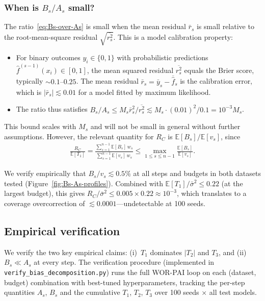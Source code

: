 \documentclass[11pt]{article}
\newcommand{\fhat}{\hat{f}}
\begin{document}
\subsubsection*{When is $B_s/A_s$ small?}

The ratio~\eqref{eq:Bs-over-As} is small when the mean residual $\bar{r}_s$ is small relative to the root-mean-square residual $\sqrt{\overline{r_s^2}}$. This is a model calibration property:
\begin{itemize}
    \item For binary outcomes $y_i \in \{0,1\}$ with probabilistic predictions $\fhat^{(s-1)}(x_i) \in [0,1]$, the mean squared residual $\overline{r_s^2}$ equals the Brier score, typically $\sim 0.1\text{--}0.25$. The mean residual $\bar{r}_s = \bar{y}_s - \overline{\fhat}_s$ is the calibration error, which is $|\bar{r}_s| \lesssim 0.01$ for a model fitted by maximum likelihood.
    \item The ratio thus satisfies $B_s/A_s \leq M_s\bar{r}_s^2/\overline{r_s^2} \lesssim M_s \cdot (0.01)^2/0.1 = 10^{-3} M_s$.
\end{itemize}

This bound scales with $M_s$ and will not be small in general without further assumptions. However, the relevant quantity for $R_C$ is $\mathbb{E}[B_s]/\mathbb{E}[v_s]$, since
\begin{align*}
    \frac{R_C}{\mathbb{E}[T_1]} = \frac{\sum_{s=1}^{n-1}\mathbb{E}[B_s]\,w_s}{\sum_{s=1}^{n-1}\mathbb{E}[v_s]\,w_s} \leq \max_{1 \leq s \leq n-1}\frac{\mathbb{E}[B_s]}{\mathbb{E}[v_s]}.
\end{align*}

We verify empirically that $B_s/v_s \lesssim 0.5\%$ at all steps and budgets in both datasets tested (Figure~\ref{fig:Bs-As-profiles}). Combined with $\mathbb{E}[T_1]/\bar{\sigma}^2 \leq 0.22$ (at the largest budget), this gives $R_C/\bar{\sigma}^2 \leq 0.005 \times 0.22 \approx 10^{-3}$, which translates to a coverage overcorrection of $\lesssim 0.0001$---undetectable at 100 seeds.


\subsection{Empirical verification}
\label{app:empirical-verification}

We verify the two key empirical claims: (i)~$T_1$ dominates $|T_2|$ and $T_3$, and (ii)~$B_s \ll A_s$ at every step. The verification procedure (implemented in \texttt{verify\_bias\_decomposition.py}) runs the full WOR-PAI loop on each (dataset, budget) combination with best-tuned hyperparameters, tracking the per-step quantities $A_s$, $B_s$ and the cumulative $T_1$, $T_2$, $T_3$ over 100 seeds $\times$ all test models.
\end{document}
